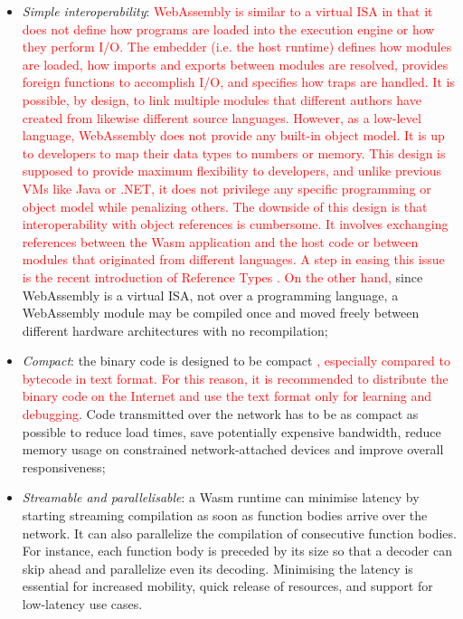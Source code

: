 \begin{itemize}
    \item \emph{Simple interoperability}: \textcolor{red}{WebAssembly is similar to a virtual ISA in that it does not define how programs are loaded into the execution engine or how they perform I/O. The embedder (i.e. the host runtime) defines how modules are loaded, how imports and exports between modules are resolved, provides foreign functions to accomplish I/O, and specifies how traps are handled. It is possible, by design, to link multiple modules that different authors have created from likewise different source languages. However, as a low-level language, WebAssembly does not provide any built-in object model. It is up to developers to map their data types to numbers or memory. This design is supposed to provide maximum flexibility to developers, and unlike previous VMs like Java or .NET, it does not privilege any specific programming or object model while penalizing others. The downside of this design is that interoperability with object references is cumbersome. It involves exchanging references between the Wasm application and the host code or between modules that originated from different languages. A step in easing this issue is the recent introduction of Reference Types \cite{reference-types}. On the other hand,} since WebAssembly is a virtual ISA, not over a programming language, a WebAssembly module may be compiled once and moved freely between different hardware architectures with no recompilation;
    \item \emph{Compact}: the binary code is designed to be compact \textcolor{red}{, especially compared to bytecode in text format. For this reason, it is recommended to distribute the binary code on the Internet and use the text format only for learning and debugging}. Code transmitted over the network has to be as compact as possible to reduce load times, save potentially expensive bandwidth, reduce memory usage on constrained network-attached devices and improve overall responsiveness;
    \item \emph{Streamable and parallelisable}: a Wasm runtime can minimise latency by starting streaming compilation as soon as function bodies arrive over the network. It can also parallelize the compilation of consecutive function bodies. For instance, each function body is preceded by its size so that a decoder can skip ahead and parallelize even its decoding. Minimising the latency is essential for increased mobility, quick release of resources, and support for low-latency use cases.
\end{itemize}

